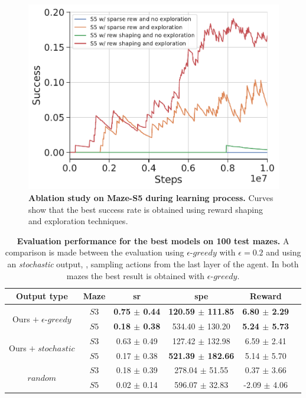 \begin{figure}
    \centering
    \includegraphics[width=0.8\linewidth]{figures/understanding_vsn/S5_ablation_success}
    \caption[Ablation study on Maze-S5 during learning process]{\textbf{Ablation study on Maze-S5 during learning process.} Curves show that the best success rate is obtained using reward shaping and exploration techniques.}
    \label{fig:ablation-maze-success}
\end{figure}

\begin{table}
    \centering
    \begin{tabular}{c c c c c c}
        \toprule
        Output type                                        & Maze & \acrshort{sr}            & \acrshort{spe}               & Reward                   \\
        \midrule
        \multirow{2}{*}{Ours $+\; \epsilon\text{-}greedy$} & $S3$ & \textbf{0.75 $\pm$ 0.44} & \textbf{120.59 $\pm$ 111.85} & \textbf{6.80 $\pm$ 2.29} \\
        & $S5$ & \textbf{0.18 $\pm$ 0.38} & 534.40 $\pm$ 130.20          & \textbf{5.24 $\pm$ 5.73} \\
        \multirow{2}{*}{Ours $+\; stochastic$}             & $S3$ & 0.63 $\pm$ 0.49          & 127.42 $\pm$ 132.98          & 6.59 $\pm$ 2.41          \\
        & $S5$ & 0.17 $\pm$ 0.38          & \textbf{521.39 $\pm$ 182.66} & 5.14 $\pm$ 5.70          \\
        \multirow{2}{*}{$random$}                          & $S3$ & 0.18 $\pm$ 0.39          & 278.04 $\pm$ 51.55           & 0.37 $\pm$ 3.66          \\
        & $S5$ & 0.02 $\pm$ 0.14          & 596.07 $\pm$ 32.83           & -2.09 $\pm$ 4.06         \\
        \bottomrule
    \end{tabular}
    \caption[Evaluation performance for the best models on 100 test mazes]{\textbf{Evaluation performance for the best models on 100 test mazes.} A comparison is made between the evaluation using $\epsilon\text{-}greedy$ with $\epsilon=0.2$ and using an \textit{stochastic} output, \ie, sampling actions from the last layer of the agent. In both mazes the best result is obtained with $\epsilon\text{-}greedy$.}
    \label{tab:results-maze}
\end{table}

